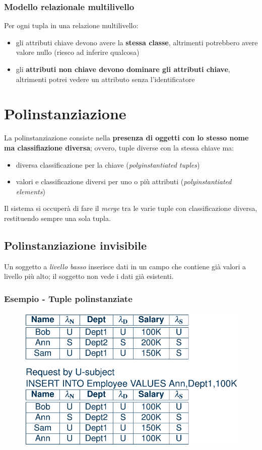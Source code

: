 \documentclass{report}
\begin{document}
\subsubsection{Modello relazionale multilivello}
Per ogni tupla in una relazione multilivello:
\begin{itemize}
    \item gli attributi chiave devono avere la \textbf{stessa classe}, altrimenti 
    potrebbero avere valore nullo (riesco ad inferire qualcosa)
    \item gli \textbf{attributi non chiave devono dominare gli attributi chiave}, 
    altrimenti potrei vedere un attributo senza l'identificatore
\end{itemize}

\section{Polinstanziazione}
La polinstanziazione consiste nella \textbf{presenza di oggetti con lo stesso nome 
ma classifiazione diversa}; ovvero, tuple diverse con la stessa chiave ma:
\begin{itemize}
    \item diversa classificazione per la chiave (\textit{polyinstantiated tuples})
    \item valori e classificazione diversi per uno o più attributi (\textit{polyinstantiated elements})
\end{itemize}

\noindent Il sistema si occuperà di fare il \textit{merge} tra le varie tuple con classificazione 
diversa, restituendo sempre una sola tupla.


\subsection{Polinstanziazione invisibile}
Un soggetto a \textit{livello basso} inserisce dati in un campo che contiene già valori 
a livello più alto; il soggetto non vede i dati già esistenti.


\subsubsection{Esempio - Tuple polinstanziate}
\begin{figure}[H]
    \centering
    \includegraphics[width=0.8\linewidth]{images/poly1.png}
\end{figure}
\end{document}
